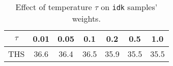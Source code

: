 \begin{table}[ht]
    \centering
    \begin{tabular}{c|cccccc}
        \hline
        \( \tau \) & 0.01 & 0.05 & 0.1 & 0.2 & 0.5 & 1.0 \\ \hline
        THS & 36.6 & 36.4 & 36.5 & 35.9 & 35.5 & 35.5 \\ \hline
    \end{tabular}
    \caption{Effect of temperature $\tau$ on \texttt{idk} samples' weights.}
    \label{tab:tem_results}
\end{table}
